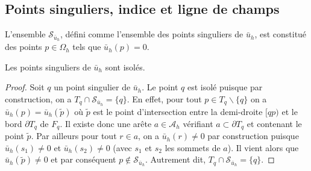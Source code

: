 \subsection{Points singuliers, indice et ligne de champs}
\label{subsec:pt_sing_ind_lign_champ}

L'ensemble $\mathcal{S}_{\bar{u}_h}$, défini comme l'ensemble des points singuliers de $\bar{u}_h$, est constitué des points $p \in \Omega_h$ tels que $\bar{u}_h(p) = 0$.
\begin{lemma}
    Les points singuliers de $\bar{u}_h$ sont isolés.
\end{lemma}
\begin{proof}
    Soit $q$ un point singulier de $\bar{u}_h$. Le point $q$ est isolé puisque par construction, on a $T_q\cap\mathcal{S}_{\bar{u}_h}=\{q\}$. En effet, pour tout $p\in T_q\backslash\{q\}$ on a $\bar{u}_h(p)=\bar{u}_h(\widetilde{p})$ où $\widetilde{p}$ est le point d'intersection entre la demi-droite $[qp)$ et le bord $\partial T_q$ de $F_q$. Il existe donc une arête $a\in\mathcal{A}_h$ vérifiant $a\subset\partial T_q$ et contenant le point $\widetilde{p}$. Par ailleurs pour tout $r\in a$, on a $\bar{u}_h(r)\neq 0$ par construction puisque $\bar{u}_h(s_1)\neq 0$ et $\bar{u}_h(s_2)\neq 0$ (avec $s_1$ et $s_2$ les sommets de $a$). Il vient alors que $\bar{u}_h(\widetilde{p})\neq 0$ et par conséquent $p\notin \mathcal{S}_{\bar{u}_h}$. Autrement dit, $T_q\cap\mathcal{S}_{\bar{u}_h}=\{q\}$.
\end{proof}

